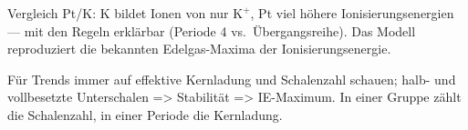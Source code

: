 \begin{kontrolle}
Vergleich Pt/K: K bildet Ionen von nur $\mathrm{K^+}$, Pt viel höhere
Ionisierungsenergien --- mit den Regeln erklärbar (Periode 4 vs.\ Übergangsreihe).
Das Modell reproduziert die bekannten Edelgas-Maxima der Ionisierungsenergie.
\end{kontrolle}

\begin{merksatz}
Für Trends immer auf effektive Kernladung und Schalenzahl schauen; halb- und
vollbesetzte Unterschalen => Stabilität => IE-Maximum. In einer Gruppe zählt
die Schalenzahl, in einer Periode die Kernladung.
\end{merksatz}
